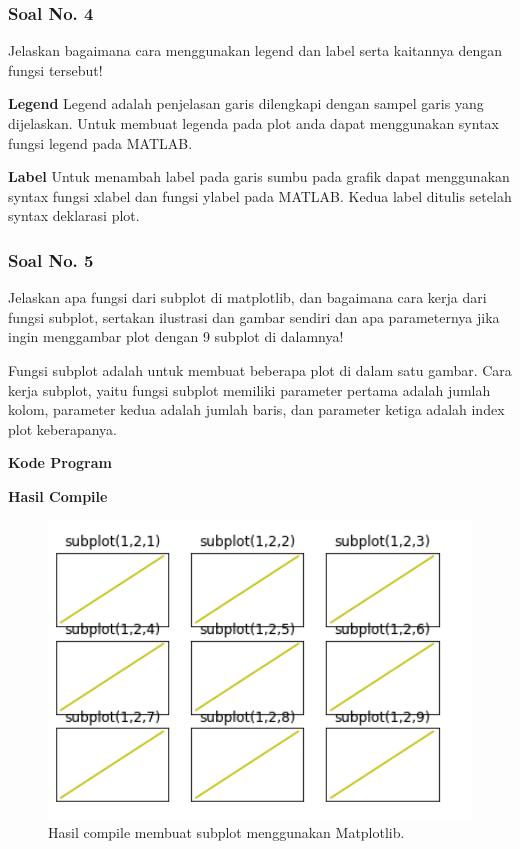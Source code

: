 \subsubsection{Soal No. 4}
\hfill \break
Jelaskan bagaimana cara menggunakan legend dan label serta kaitannya dengan fungsi tersebut!

\textbf{Legend}
Legend adalah penjelasan garis dilengkapi dengan sampel garis yang dijelaskan. Untuk membuat legenda pada plot anda dapat menggunakan syntax fungsi legend pada MATLAB. 

\textbf{Label}
Untuk menambah label pada garis sumbu pada grafik dapat menggunakan syntax fungsi xlabel dan fungsi ylabel pada MATLAB. Kedua label ditulis setelah syntax deklarasi plot.

\subsubsection{Soal No. 5}
\hfill \break
Jelaskan apa fungsi dari subplot di matplotlib, dan bagaimana cara kerja dari fungsi subplot, sertakan ilustrasi dan gambar sendiri dan apa parameternya jika ingin menggambar plot dengan 9 subplot di dalamnya!

\hfill \break
Fungsi subplot adalah untuk membuat beberapa plot di dalam satu gambar.
\hfill \break
Cara kerja subplot, yaitu fungsi subplot memiliki parameter pertama adalah jumlah kolom, parameter kedua adalah jumlah baris, dan parameter ketiga adalah index plot keberapanya.

\hfill \break
\textbf{Kode Program}



\hfill \break
\textbf{Hasil Compile}

\begin{figure}[H]
	\includegraphics[width=12cm]{figures/6/1174034/Teori/subplot.png}
	\centering
	\caption{Hasil compile membuat subplot menggunakan Matplotlib.}
\end{figure}

